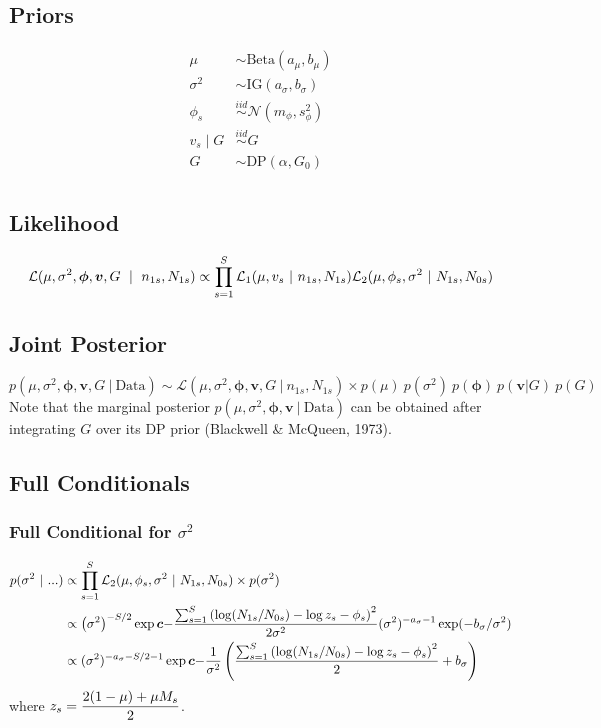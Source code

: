 \documentclass[12pt]{article}
\newcommand{\bc}{\mbox{\boldmath $c$}}
\newcommand{\iid}{\stackrel{iid}{\sim}}
\begin{document}
\subsection{Priors}
\begin{align*}
\mu &\sim \text{Beta}(a_\mu,b_\mu)\\
\sigma^2 &\sim \text{IG}(a_\sigma,b_\sigma)\\
\phi_s &\iid \mathcal{N}(m_\phi,s^2_\phi) \\
v_s \mid G &\iid G \\
G &\sim \text{DP}(\alpha,G_0) \\
\end{align*}

\subsection{Likelihood}
$$
\mathcal{L}(\mu,\sigma^2,\bm{\phi},\bm{v},G~\mid~n_{1s},N_{1s}) \propto \displaystyle\prod_{s=1}^S \mathcal{L}_1(\mu,v_s~|~n_{1s},N_{1s})\mathcal{L}_2(\mu,\phi_s,\sigma^2~|~N_{1s},N_{0s})
$$

\subsection{Joint Posterior}
$$
p(\mu,\sigma^2, \bm\phi, \bm v, G ~|~ \text{Data}) \sim \mathcal{L}(\mu,\sigma^2,\bm\phi,\bm v,G~|~n_{1s},N_{1s}) \times p(\mu)~p(\sigma^2)~p(\bm\phi)~p(\bm v|G)~p(G)
$$
Note that the marginal posterior $p(\mu,\sigma^2, \bm\phi,\bm v ~|~ \text{Data})$ can be obtained after integrating $G$ over its DP prior (Blackwell \& McQueen, 1973).

\subsection{Full Conditionals}

\subsubsection{Full Conditional for $\sigma^2$}
\begin{align*}
p(\sigma^2 ~|~ ...) &\propto \prod_{s=1}^S \mathcal{L}_2(\mu,\phi_s,\sigma^2 ~|~ N_{1s}, N_{0s}) \times p(\sigma^2)\\
                    &\propto \p{\sigma^2}^{-S/2}\exp\bc{\ds-\frac{\sums\p{\log(N_{1s}/N_{0s})-\log z_s-\phi_s}^2}{2\sigma^2}} (\sigma^2)^{-a_\sigma-1} \exp(-b_\sigma/\sigma^2)\\
                    &\propto (\sigma^2)^{-a_\sigma-S/2-1} \exp\bc{-\frac{1}{\sigma^2}\p{\frac{\sums\p{\log(N_{1s}/N_{0s})-\log z_s-\phi_s}^2}{2}+b_\sigma}}\\
\end{align*}
where $z_s = \displaystyle\frac{2(1-\mu)+\mu M_s}{2}$.
\end{document}
